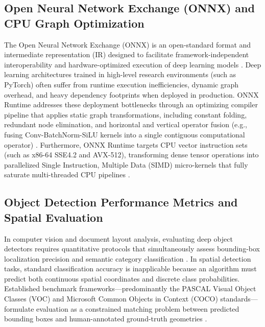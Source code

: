 \subsection{Open Neural Network Exchange (ONNX) and CPU Graph Optimization}

The Open Neural Network Exchange (ONNX) is an open-standard format and intermediate representation (IR) designed to facilitate framework-independent interoperability and hardware-optimized execution of deep learning models \cite{ref32}.
Deep learning architectures trained in high-level research environments (such as PyTorch) often suffer from runtime execution inefficiencies, dynamic graph overhead, and heavy dependency footprints when deployed in production.
ONNX Runtime addresses these deployment bottlenecks through an optimizing compiler pipeline that applies static graph transformations, including constant folding, redundant node elimination, and horizontal and vertical operator fusion (e.g., fusing Conv-BatchNorm-SiLU kernels into a single contiguous computational operator) \cite{ref32, ref33}.
Furthermore, ONNX Runtime targets CPU vector instruction sets (such as x86-64 SSE4.2 and AVX-512), transforming dense tensor operations into parallelized Single Instruction, Multiple Data (SIMD) micro-kernels that fully saturate multi-threaded CPU pipelines \cite{ref33}.

\subsection{Object Detection Performance Metrics and Spatial Evaluation}
\label{sec:detection_metrics_theory}

In computer vision and document layout analysis, evaluating deep object detectors requires quantitative protocols that simultaneously assess bounding-box localization precision and semantic category classification \cite{docxa1}.
In spatial detection tasks, standard classification accuracy is inapplicable because an algorithm must predict both continuous spatial coordinates and discrete class probabilities.
Established benchmark frameworks---predominantly the PASCAL Visual Object Classes (VOC) and Microsoft Common Objects in Context (COCO) standards---formulate evaluation as a constrained matching problem between predicted bounding boxes and human-annotated ground-truth geometries \cite{docxa1}.

